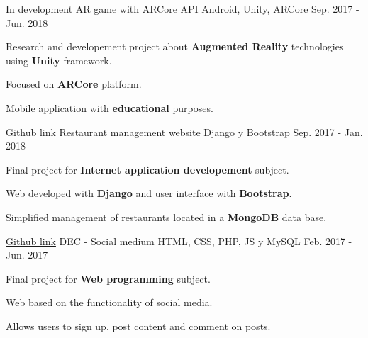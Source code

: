 

\begin{cventries}

  \cventry
    {{In development}} %
    {AR game with ARCore API} %
    {Android, Unity, ARCore} %
    {Sep. 2017 - Jun. 2018} %
    {
      \begin{cvitems} %
        \item {Research and developement project about \textbf{Augmented Reality} technologies using \textbf{Unity} framework.}
        \item {Focused on \textbf{ARCore} platform.}
        \item {Mobile application with \textbf{educational} purposes.}
      \end{cvitems}
    }

  \cventry
    {\href{https://github.com/matl1995/DAI}{Github link}} %
    {Restaurant management website} %
    {Django y Bootstrap} %
    {Sep. 2017 - Jan. 2018} %
    {
      \begin{cvitems} %
        \item {Final project for \textbf{Internet application developement} subject.}
        \item {Web developed with \textbf{Django} and user interface with \textbf{Bootstrap}.}
        \item {Simplified management of restaurants located in a \textbf{MongoDB} data base.}
      \end{cvitems}
    }

  \cventry
    {\href{https://github.com/matl1995/PW}{Github link}} %
    {DEC - Social medium} %
    {HTML, CSS, PHP, JS y MySQL} %
    {Feb. 2017 - Jun. 2017} %
    {
      \begin{cvitems} %
        \item {Final project for \textbf{Web programming} subject.}
        \item {Web based on the functionality of social media.}
        \item {Allows users to sign up, post content and comment on posts.}
      \end{cvitems}
    }


\end{cventries}

